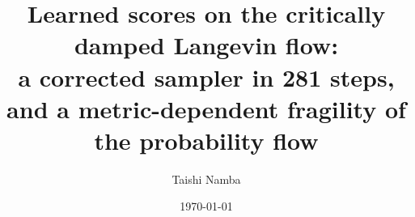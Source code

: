 \documentclass[aps,pre,twocolumn,superscriptaddress,nofootinbib]{revtex4-2}
\begin{document}
\title{\texorpdfstring{Learned scores on the critically damped Langevin flow:\\ a corrected sampler in 281 steps, and a metric-dependent fragility of the probability flow}{Learned scores on the critically damped Langevin flow: a corrected sampler in 281 steps, and a metric-dependent fragility of the probability flow}}

\author{Taishi Namba}

\date{\today}

\begin{abstract}

\end{abstract}

\maketitle











\appendix




\end{document}
